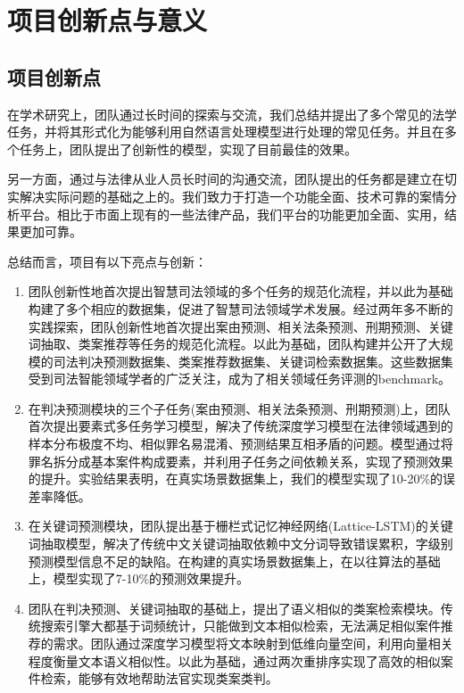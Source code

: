 \chapter{项目创新点与意义}
\label{cha: significance}

\section{项目创新点}

在学术研究上，团队通过长时间的探索与交流，我们总结并提出了多个常见的法学任务，并将其形式化为能够利用自然语言处理模型进行处理的常见任务。并且在多个任务上，团队提出了创新性的模型，实现了目前最佳的效果。

另一方面，通过与法律从业人员长时间的沟通交流，团队提出的任务都是建立在切实解决实际问题的基础之上的。我们致力于打造一个功能全面、技术可靠的案情分析平台。相比于市面上现有的一些法律产品，我们平台的功能更加全面、实用，结果更加可靠。

总结而言，项目有以下亮点与创新：

\begin{enumerate}[1)]
	\item 团队创新性地首次提出智慧司法领域的多个任务的规范化流程，并以此为基础构建了多个相应的数据集，促进了智慧司法领域学术发展。经过两年多不断的实践探索，团队创新性地首次提出案由预测、相关法条预测、刑期预测、关键词抽取、类案推荐等任务的规范化流程。以此为基础，团队构建并公开了大规模的司法判决预测数据集、类案推荐数据集、关键词检索数据集。这些数据集受到司法智能领域学者的广泛关注，成为了相关领域任务评测的benchmark。
	\item 在判决预测模块的三个子任务(案由预测、相关法条预测、刑期预测)上，团队首次提出要素式多任务学习模型，解决了传统深度学习模型在法律领域遇到的样本分布极度不均、相似罪名易混淆、预测结果互相矛盾的问题。模型通过将罪名拆分成基本案件构成要素，并利用子任务之间依赖关系，实现了预测效果的提升。实验结果表明，在真实场景数据集上，我们的模型实现了10-20\%的误差率降低。
	\item 在关键词预测模块，团队提出基于栅栏式记忆神经网络(Lattice-LSTM)的关键词抽取模型，解决了传统中文关键词抽取依赖中文分词导致错误累积，字级别预测模型信息不足的缺陷。在构建的真实场景数据集上，在以往算法的基础上，模型实现了7-10\%的预测效果提升。
	\item 团队在判决预测、关键词抽取的基础上，提出了语义相似的类案检索模块。传统搜索引擎大都基于词频统计，只能做到文本相似检索，无法满足相似案件推荐的需求。团队通过深度学习模型将文本映射到低维向量空间，利用向量相关程度衡量文本语义相似性。以此为基础，通过两次重排序实现了高效的相似案件检索，能够有效地帮助法官实现类案类判。
\end{enumerate}

